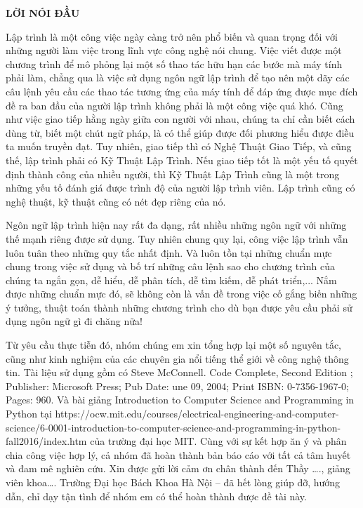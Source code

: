 \documentclass[12pt]{report}
\begin{document}
\begin{center}
\LARGE\bfseries LỜI NÓI ĐẦU
\end{center}

Lập trình là một công việc ngày càng trở nên phổ biến và quan trọng đối với những người làm việc trong lĩnh vực công nghệ nói chung. Việc viết được một chương trình để mô phỏng lại một số thao tác hữu hạn các bước mà máy tính phải làm, chẳng qua là việc sử dụng ngôn ngữ lập trình để tạo nên một dãy các câu lệnh yêu cầu các thao tác tương ứng của máy tính để đáp ứng được mục đích đề ra ban đầu của người lập trình không phải là một công việc quá khó. Cũng như việc giao tiếp hằng ngày giữa con người với nhau, chúng ta chỉ cần biết cách dùng từ, biết một chút ngữ pháp, là có thể giúp được đối phương hiểu được điều ta muốn truyền đạt. Tuy nhiên, giao tiếp thì có Nghệ Thuật Giao Tiếp, và cũng thế, lập trình phải có Kỹ Thuật Lập Trình. Nếu giao tiếp tốt là một yếu tố quyết định thành công của nhiều người, thì Kỹ Thuật Lập Trình cũng là một trong những yếu tố đánh giá được trình độ của người lập trình viên. Lập trình cũng có nghệ thuật, kỹ thuật cũng có nét đẹp riêng của nó. 

Ngôn ngữ lập trình hiện nay rất đa dạng, rất nhiều những ngôn ngữ với những thế mạnh riêng được sử dụng. Tuy nhiên chung quy lại, công việc lập trình vẫn luôn tuân theo những quy tắc nhất định. Và luôn tồn tại những chuẩn mực chung trong việc sử dụng và bố trí những câu lệnh sao cho chương trình của chúng ta ngắn gọn, dễ hiểu, dễ phân tích, dễ tìm kiếm, dễ phát triển,... Nắm được những chuẩn mực đó, sẽ không còn là vấn đề trong việc cố gắng biến những ý tưởng, thuật toán thành những chương trình cho dù bạn được yêu cầu phải sử dụng ngôn ngữ gì đi chăng nữa!

Từ yêu cầu thực tiễn đó, nhóm chúng em xin tổng hợp lại một số nguyên tắc, cũng như kinh nghiệm của các chuyên gia nổi tiếng thể giới về công nghệ thông tin. Tài liệu sử dụng gồm có Steve McConnell. Code Complete, Second Edition ; Publisher: Microsoft Press; Pub Date: une 09, 2004; Print ISBN: 0-7356-1967-0; Pages: 960. Và bài giảng Introduction to Computer Science and Programming in Python tại https://ocw.mit.edu/courses/electrical-engineering-and-computer-science/6-0001-introduction-to-computer-science-and-programming-in-python-fall2016/index.htm của trường đại học MIT. Cùng với sự kết hợp ăn ý và phân chia công việc hợp lý, cả nhóm đã hoàn thành bản báo cáo với tất cả tâm huyết và đam mê nghiên cứu. Xin được gửi lời cảm ơn chân thành đến Thầy …., giảng viên khoa…. Trường Đại học Bách Khoa Hà Nội – đã hết lòng giúp đỡ, hướng dẫn, chỉ dạy tận tình để nhóm em có thể hoàn thành được đề tài này.
\end{document}
